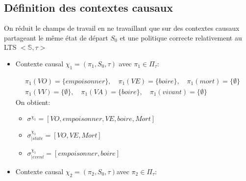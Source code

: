 \documentclass[11pt]{extarticle}
\begin{document}
\subsection{Définition des contextes causaux}
On réduit le champs de travail en ne travaillant que sur des contextes causaux partageant le même état de départ $S_0$ et une politique correcte relativement au LTS $<\mathds{S},\tau>$
\begin{itemize}
\item Contexte causal  $\chi_1 = (\pi_1,S_0,\tau)$ avec $\pi_1\in \Pi_\tau:$


    \begin{minipage}{0.45\textwidth}
        \begin{align*}
            &\pi_1(VO)= \{empoisonner\}, \quad \pi_1(VE)= \{boire\}, \quad \pi_1(mort)=\{\emptyset\} \quad \\ 
            &\pi_1(VV) = \{\emptyset\},\quad \pi_1(VA) = \{boire\},\quad \pi_1(vivant)=\{\emptyset\}
        \end{align*}
        On obtient:
    \begin{itemize}
        \item $\sigma^{\chi_1}= [VO,empoisonner,VE,boire, Mort]$
        \item $\sigma^{\chi_1}_{|state}=[VO,VE,Mort]$
        \item $\sigma^{\chi_1}_{|event}=[empoisonner,boire]$
    \end{itemize}
    \end{minipage}   
    \hfill
    \begin{minipage}{0.45\textwidth}

    \end{minipage}


    \item Contexte causal $\chi_2 = (\pi_2,S_0,\tau)$avec $\pi_2\in \Pi_\tau:$


\end{itemize}
\end{document}
